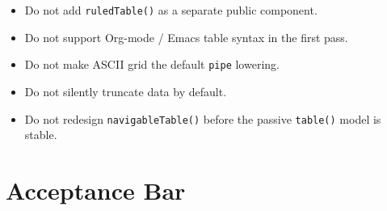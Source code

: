 \begin{itemize}
\tightlist
\item
  Do not add \texttt{r\allowbreak{}u\allowbreak{}l\allowbreak{}e\allowbreak{}d\allowbreak{}T\allowbreak{}a\allowbreak{}b\allowbreak{}l\allowbreak{}e\allowbreak{}(\allowbreak{})} as a separate public component.
\item
  Do not support Org-mode / Emacs table syntax in the first pass.
\item
  Do not make ASCII grid the default \texttt{p\allowbreak{}i\allowbreak{}p\allowbreak{}e} lowering.
\item
  Do not silently truncate data by default.
\item
  Do not redesign \texttt{n\allowbreak{}a\allowbreak{}v\allowbreak{}i\allowbreak{}g\allowbreak{}a\allowbreak{}b\allowbreak{}l\allowbreak{}e\allowbreak{}T\allowbreak{}a\allowbreak{}b\allowbreak{}l\allowbreak{}e\allowbreak{}(\allowbreak{})} before the passive \texttt{t\allowbreak{}a\allowbreak{}b\allowbreak{}l\allowbreak{}e\allowbreak{}(\allowbreak{})} model is stable.
\end{itemize}

\section{Acceptance Bar}\label{record-133-acceptance-bar}

